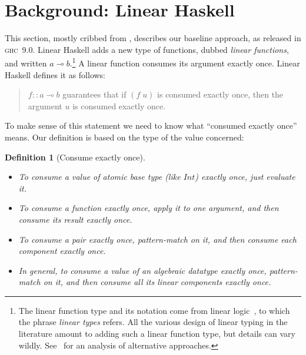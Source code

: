 \documentclass[acmsmall,usenames,dvipsnames,natbib=false,acmthm=false,screen]{acmart}
\newcommand{\Conid}[1]{\mathit{#1}}
\newcommand{\Varid}[1]{\mathit{#1}}
\theoremstyle{acmplain}
\theoremstyle{acmdefinition}
\newtheorem{definition}[theorem]{Definition}
\begin{document}
\section{Background: Linear Haskell}
\label{sec:linear-types}

This section, mostly cribbed from \citet[Section 2.1]{LinearHaskell},
describes our baseline approach, as released in \textsc{ghc}~9.0.
%
Linear Haskell adds a new type of functions,
dubbed \emph{linear functions}, and written \ensuremath{\Varid{a}\mathbin{⊸}\Varid{b}}.\footnote{The linear function
  type and its notation come from linear
  logic~\cite{girard-linear-logic}, to which the phrase \emph{linear
    types} refers. All the various design of linear typing in the
  literature amount to adding such a linear function type, but details
  can vary wildly. See~\citet[Section 6]{LinearHaskell} for an analysis
  of alternative approaches.} A linear function consumes its
  argument exactly once. Linear Haskell defines it as follows: %

\begin{quote}
\ensuremath{\Varid{f}\mathbin{::}\Varid{a}\mathbin{⊸}\Varid{b}} guarantees that if \ensuremath{(\Varid{f}\;\Varid{u})} is consumed exactly once,
then the argument \ensuremath{\Varid{u}} is consumed exactly once.
\end{quote}
To make sense of this statement we need to know what ``consumed exactly once'' means.
Our definition is based on the type of the value concerned:
\begin{definition}[Consume exactly once]~ \label{def:consume}
\begin{itemize}
\item To consume a value of atomic base type (like \ensuremath{\Conid{Int}}) exactly once, just evaluate it.
\item To consume a function exactly once, apply it to one argument, and then consume its result exactly once.
\item To consume a pair exactly once, pattern-match on it, and then consume each component exactly once.
\item In general, to consume a value of an algebraic datatype exactly once, pattern-match on it,
  and then consume all its linear components exactly once.
\end{itemize}
\end{definition}
%
\end{document}
